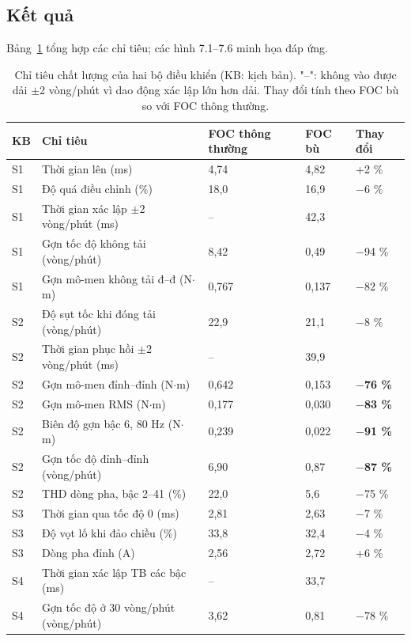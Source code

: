 \subsection{Kết quả}\label{sec:7.3}

Bảng~\ref{tab:7.2} tổng hợp các chỉ tiêu; các hình 7.1–7.6 minh họa đáp ứng.

\begin{table}[H]
\centering\small
\caption{Chỉ tiêu chất lượng của hai bộ điều khiển (KB: kịch bản). "–": không vào được dải $\pm$2 vòng/phút vì dao động xác lập lớn hơn dải. Thay đổi tính theo FOC bù so với FOC thông thường.}\label{tab:7.2}
\begin{tabular}{@{}lllll@{}}
\toprule
KB & Chỉ tiêu & FOC thông thường & FOC bù & Thay đổi \\ \midrule
S1 & Thời gian lên (ms) & 4,74 & 4,82 & +2 \% \\
S1 & Độ quá điều chỉnh (\%) & 18,0 & 16,9 & $-$6 \% \\
S1 & Thời gian xác lập $\pm$2 vòng/phút (ms) & – & 42,3 &  \\
S1 & Gợn tốc độ không tải (vòng/phút) & 8,42 & 0,49 & $-$94 \% \\
S1 & Gợn mô-men không tải đ–đ (N$\cdot$m) & 0,767 & 0,137 & $-$82 \% \\
S2 & Độ sụt tốc khi đóng tải (vòng/phút) & 22,9 & 21,1 & $-$8 \% \\
S2 & Thời gian phục hồi $\pm$2 vòng/phút (ms) & – & 39,9 &  \\
S2 & Gợn mô-men đỉnh–đỉnh (N$\cdot$m) & 0,642 & 0,153 & \textbf{$-$76 \%} \\
S2 & Gợn mô-men RMS (N$\cdot$m) & 0,177 & 0,030 & \textbf{$-$83 \%} \\
S2 & Biên độ gợn bậc 6, 80 Hz (N$\cdot$m) & 0,239 & 0,022 & \textbf{$-$91 \%} \\
S2 & Gợn tốc độ đỉnh–đỉnh (vòng/phút) & 6,90 & 0,87 & \textbf{$-$87 \%} \\
S2 & THD dòng pha, bậc 2–41 (\%) & 22,0 & 5,6 & $-$75 \% \\
S3 & Thời gian qua tốc độ 0 (ms) & 2,81 & 2,63 & $-$7 \% \\
S3 & Độ vọt lố khi đảo chiều (\%) & 33,8 & 32,4 & $-$4 \% \\
S3 & Dòng pha đỉnh (A) & 2,56 & 2,72 & +6 \% \\
S4 & Thời gian xác lập TB các bậc (ms) & – & 33,7 &  \\
S4 & Gợn tốc độ ở 30 vòng/phút (vòng/phút) & 3,62 & 0,81 & $-$78 \% \\
\bottomrule
\end{tabular}
\end{table}

